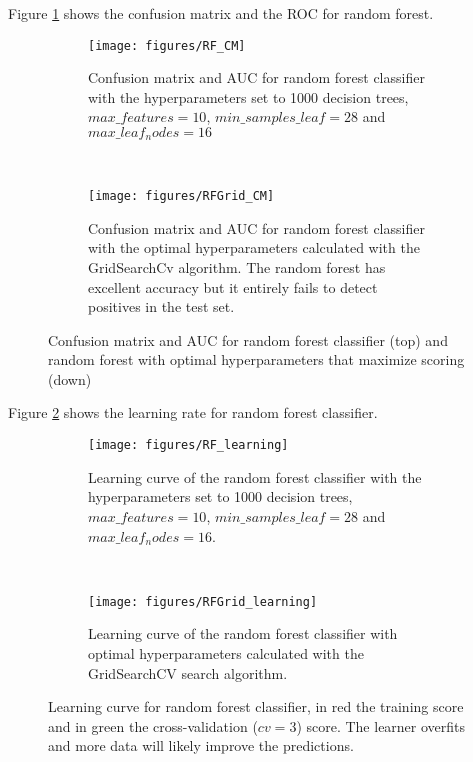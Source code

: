 \documentclass[11pt]{article}
\theoremstyle{definition}
\theoremstyle{remark}
\begin{document}
{Figure \ref{fig:rf_cm} shows the confusion matrix and the ROC for random forest. 
\begin{figure}[H]
    \centering
    \begin{subfigure}[t]{.8\textwidth}
        \centering
        \texttt{[image: figures/RF\_CM]}
        \caption{Confusion matrix and AUC for random forest classifier with the hyperparameters set to 1000 decision trees, $max\_features= 10$, $min\_samples\_leaf=28$ and $max\_leaf_nodes=16$}
    \end{subfigure}
    ~ 
    \begin{subfigure}[t]{.8\textwidth}
        \centering
        \texttt{[image: figures/RFGrid\_CM]}
        \caption{Confusion matrix and AUC for random forest classifier with the optimal hyperparameters calculated with the GridSearchCv algorithm. The random forest has excellent accuracy but it entirely fails to detect positives in the test set.}
    \end{subfigure}%
    
    \caption{Confusion matrix and AUC for random forest classifier (top) and random forest with optimal hyperparameters that maximize scoring (down)} \label{fig:rf_cm}
\end{figure}

Figure \ref{fig:rf_learning} shows the learning rate for random forest classifier. 
\begin{figure}[H]
    \centering
    \begin{subfigure}[t]{.8\textwidth}
        \centering
        \texttt{[image: figures/RF\_learning]}
        \caption{Learning curve of the random forest classifier with the hyperparameters set to 1000 decision trees, $max\_features= 10$, $min\_samples\_leaf=28$ and $max\_leaf_nodes=16$.}
    \end{subfigure}
    ~ 
    \begin{subfigure}[t]{.8\textwidth}
        \centering
        \texttt{[image: figures/RFGrid\_learning]}
        \caption{Learning curve of the random forest classifier with optimal hyperparameters calculated with the GridSearchCV search algorithm.}
    \end{subfigure}%
    
    \caption{Learning curve for random forest classifier, in red the training score and in green the cross-validation ($cv=3$) score. The learner overfits and more data will likely improve the predictions.} \label{fig:rf_learning}
\end{figure}

}
\end{document}
